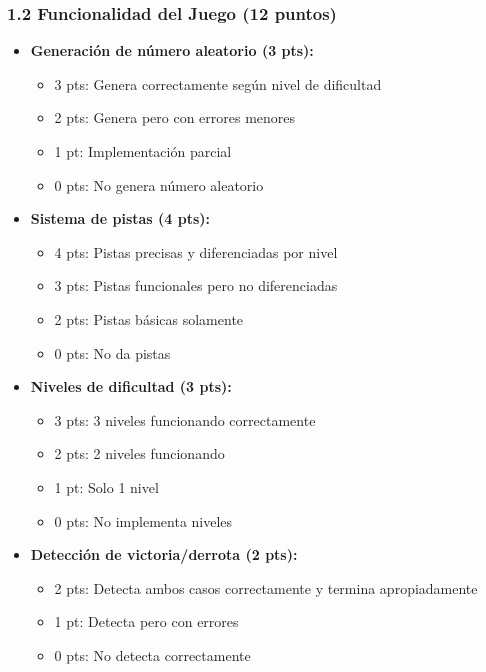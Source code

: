 \documentclass[12pt,a4paper]{article}
\begin{document}
\subsubsection{1.2 Funcionalidad del Juego (12 puntos)}

\begin{itemize}[leftmargin=*]
    \item \textbf{Generación de número aleatorio (3 pts):}
    \begin{itemize}
        \item 3 pts: Genera correctamente según nivel de dificultad
        \item 2 pts: Genera pero con errores menores
        \item 1 pt: Implementación parcial
        \item 0 pts: No genera número aleatorio
    \end{itemize}
    
    \item \textbf{Sistema de pistas (4 pts):}
    \begin{itemize}
        \item 4 pts: Pistas precisas y diferenciadas por nivel
        \item 3 pts: Pistas funcionales pero no diferenciadas
        \item 2 pts: Pistas básicas solamente
        \item 0 pts: No da pistas
    \end{itemize}
    
    \item \textbf{Niveles de dificultad (3 pts):}
    \begin{itemize}
        \item 3 pts: 3 niveles funcionando correctamente
        \item 2 pts: 2 niveles funcionando
        \item 1 pt: Solo 1 nivel
        \item 0 pts: No implementa niveles
    \end{itemize}
    
    \item \textbf{Detección de victoria/derrota (2 pts):}
    \begin{itemize}
        \item 2 pts: Detecta ambos casos correctamente y termina apropiadamente
        \item 1 pt: Detecta pero con errores
        \item 0 pts: No detecta correctamente
    \end{itemize}
\end{itemize}
\end{document}
